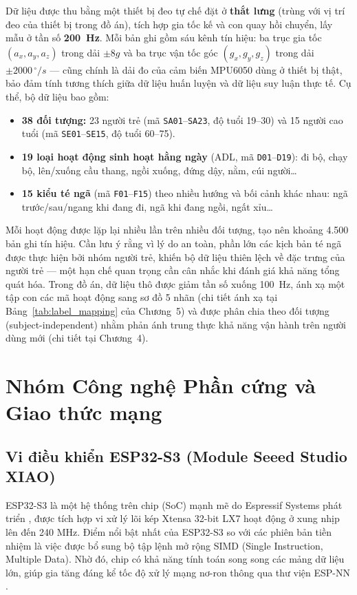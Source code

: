 \documentclass[../DoAn.tex]{subfiles}
\begin{document}
Dữ liệu được thu bằng một thiết bị đeo tự chế đặt ở \textbf{thắt lưng} (trùng với vị trí đeo của thiết bị trong đồ án), tích hợp gia tốc kế và con quay hồi chuyển, lấy mẫu ở tần số \textbf{200~Hz}. Mỗi bản ghi gồm sáu kênh tín hiệu: ba trục gia tốc $(a_x, a_y, a_z)$ trong dải $\pm 8g$ và ba trục vận tốc góc $(g_x, g_y, g_z)$ trong dải $\pm 2000\,^{\circ}/s$ --- cũng chính là dải đo của cảm biến MPU6050 dùng ở thiết bị thật, bảo đảm tính tương thích giữa dữ liệu huấn luyện và dữ liệu suy luận thực tế. Cụ thể, bộ dữ liệu bao gồm:
\begin{itemize}
    \item \textbf{38 đối tượng:} 23 người trẻ (mã \texttt{SA01}--\texttt{SA23}, độ tuổi 19--30) và 15 người cao tuổi (mã \texttt{SE01}--\texttt{SE15}, độ tuổi 60--75).
    \item \textbf{19 loại hoạt động sinh hoạt hằng ngày} (ADL, mã \texttt{D01}--\texttt{D19}): đi bộ, chạy bộ, lên/xuống cầu thang, ngồi xuống, đứng dậy, nằm, cúi người\ldots
    \item \textbf{15 kiểu té ngã} (mã \texttt{F01}--\texttt{F15}) theo nhiều hướng và bối cảnh khác nhau: ngã trước/sau/ngang khi đang đi, ngã khi đang ngồi, ngất xỉu\ldots
\end{itemize}
Mỗi hoạt động được lặp lại nhiều lần trên nhiều đối tượng, tạo nên khoảng 4.500 bản ghi tín hiệu. Cần lưu ý rằng vì lý do an toàn, phần lớn các kịch bản té ngã được thực hiện bởi nhóm người trẻ, khiến bộ dữ liệu thiên lệch về đặc trưng của người trẻ --- một hạn chế quan trọng cần cân nhắc khi đánh giá khả năng tổng quát hóa. Trong đồ án, dữ liệu thô được giảm tần số xuống 100~Hz, ánh xạ một tập con các mã hoạt động sang sơ đồ 5 nhãn (chi tiết ánh xạ tại Bảng~\ref{tab:label_mapping} của Chương~5) và được phân chia theo đối tượng (subject-independent) nhằm phản ánh trung thực khả năng vận hành trên người dùng mới (chi tiết tại Chương~4).

\section{Nhóm Công nghệ Phần cứng và Giao thức mạng}
\label{section:3.2}

\subsection{Vi điều khiển ESP32-S3 (Module Seeed Studio XIAO)}
ESP32-S3 là một hệ thống trên chip (SoC) mạnh mẽ do Espressif Systems phát triển \cite{espressif2023esp32s3}, được tích hợp vi xử lý lõi kép Xtensa 32-bit LX7 hoạt động ở xung nhịp lên đến 240 MHz. Điểm nổi bật nhất của ESP32-S3 so với các phiên bản tiền nhiệm là việc được bổ sung bộ tập lệnh mở rộng SIMD (Single Instruction, Multiple Data). Nhờ đó, chip có khả năng tính toán song song các mảng dữ liệu lớn, giúp gia tăng đáng kể tốc độ xử lý mạng nơ-ron thông qua thư viện ESP-NN \cite{espressif2023espnn}. 
\end{document}
